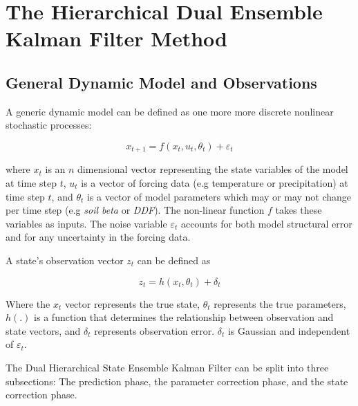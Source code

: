 \chapter{The Hierarchical Dual Ensemble Kalman Filter Method}


\section{General Dynamic Model and Observations}


A generic dynamic model can be defined as one more more discrete nonlinear stochastic processes\cite{Chen2008}:

\begin{equation}\label{eq:gen_stoc}
x_{t+1} = f(x_{t}, u_{t}, \theta_{t}) + \varepsilon_{t}
\end{equation}

where $x_{t}$ is an $n$ dimensional vector representing the state variables of the model at time step $t$, $u_{t}$ is a vector of forcing data (e.g temperature or precipitation) at time step $t$, and $\theta_{t}$ is a vector of model parameters which may or may not change per time step (e.g \textit{soil beta }or \textit{DDF}). The non-linear function $f$ takes these variables as inputs. The noise variable $\varepsilon_{t}$ accounts for both model structural error and for any uncertainty in the forcing data.

A state's observation vector $z_{t}$ can be defined as

\begin{equation}\label{eq:gen_obs}
z_{t} = h(x_{t}, \theta_{t}) + \delta_{t}
\end{equation}

Where the $x_{t}$ vector represents the true state, $\theta_{t}$ represents the true parameters, $h(.)$ is a function that determines the relationship between observation and state vectors, and $\delta_{t}$ represents observation error. $\delta_{t}$ is Gaussian and independent of $\varepsilon_{t}$.

The Dual Hierarchical State Ensemble Kalman Filter can be split into three subsections: The prediction phase, the parameter correction phase, and the state correction phase. 

